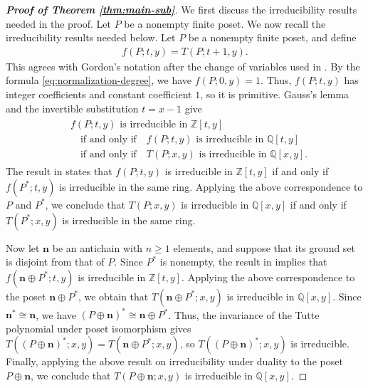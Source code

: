 \documentclass[11pt,a4paper]{article}
\begin{document}
\begin{proof}[\rm\textbf{Proof of Theorem \ref{thm:main-sub}}]
We first discuss the irreducibility results needed in the proof.
Let $P$ be a nonempty finite poset.
We now recall the irreducibility results needed below.
Let $P$ be a nonempty finite poset, and define
\begin{eqnarray*}
f(P;t,y)=T(P;t+1,y).
\end{eqnarray*}
This agrees with Gordon's notation after the change of variables used in \cite{Gordon1996}.
By the formula \eqref{eq:normalization-degree}, we have $f(P;0,y)=1$.
Thus, $f(P;t,y)$ has integer coefficients and constant
coefficient $1$, so it is primitive.
Gauss's lemma and the invertible substitution $t=x-1$
give
\begin{eqnarray*}
\begin{aligned}
&f(P;t,y)\text{ is irreducible in }\mathbb Z[t,y]\\
&\quad\text{if and only if}\quad
f(P;t,y)\text{ is irreducible in }\mathbb Q[t,y]\\
&\quad\text{if and only if}\quad
T(P;x,y)\text{ is irreducible in }\mathbb Q[x,y].
\end{aligned}
\end{eqnarray*}
The result in \cite{Gordon1996} states that $f(P;t,y)$
is irreducible in $\mathbb Z[t,y]$ if and only if
$f(P^*;t,y)$ is irreducible in the same ring.
Applying the above correspondence to $P$ and $P^*$,
we conclude that $T(P;x,y)$ is irreducible in $\mathbb Q[x,y]$
if and only if $T(P^*;x,y)$ is irreducible in the same ring.



Now let $\mathbf n$ be an antichain with $n\geq1$ elements,
and suppose that its ground set is disjoint from that of $P$.
Since $P^*$ is nonempty, the result in \cite{Gordon1996}
implies that $f(\mathbf n\oplus P^*;t,y)$
is irreducible in $\mathbb Z[t,y]$.
Applying the above correspondence to the poset
$\mathbf n\oplus P^*$, we obtain that
$T(\mathbf n\oplus P^*;x,y)$
is irreducible in $\mathbb Q[x,y]$.
Since $\mathbf n^*\cong\mathbf n$, we have
$(P\oplus\mathbf n)^*\cong\mathbf n\oplus P^*$.
Thus, the invariance of the Tutte polynomial under poset isomorphism
gives
$T((P\oplus\mathbf n)^*;x,y)=T(\mathbf n\oplus P^*;x,y)$,
so $T((P\oplus\mathbf n)^*;x,y)$ is irreducible.
Finally, applying the above result on irreducibility under duality
to the poset $P\oplus\mathbf n$, we conclude that
$T(P\oplus\mathbf n;x,y)$ is irreducible in $\mathbb Q[x,y]$.


\end{proof}
\end{document}
